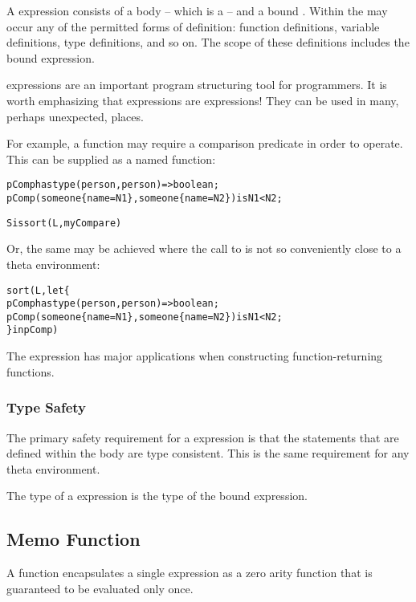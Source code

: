 A  expression consists of a body -- which is a  -- and a bound . Within the  may occur any of the permitted forms of definition: function definitions, variable definitions, type definitions, and so on. The scope of these definitions includes the bound expression.

\begin{aside}
 expressions are an important program structuring tool for programmers. It is worth emphasizing that  expressions are expressions! They can be used in many, perhaps unexpected, places.

For example, a  function may require a comparison predicate in order to operate. This can be supplied as a named function:
\begin{alltt}
pComp has type (person,person)=>boolean;
pComp(someone\{name=N1\},someone\{name=N2\}) is N1<N2;

S is sort(L,myCompare)
\end{alltt}
Or, the same may be achieved where the call to  is not so conveniently close to a theta environment:
\begin{alltt}
sort(L, let\{
  pComp has type (person,person)=>boolean;
  pComp(someone\{name=N1\},someone\{name=N2\}) is N1<N2;
\} in pComp)
\end{alltt}
The  expression has major applications when constructing function-returning functions.
\end{aside}

\subsubsection{Type Safety}
The primary safety requirement for a  expression is that the statements that are defined within the body are type consistent. This is the same requirement for any theta environment.

The type of a  expression is the type of the bound expression.


\subsection{Memo Function}
\label{memoFunction}

A  function encapsulates a single expression as a zero arity function that is guaranteed to be evaluated only once. 

